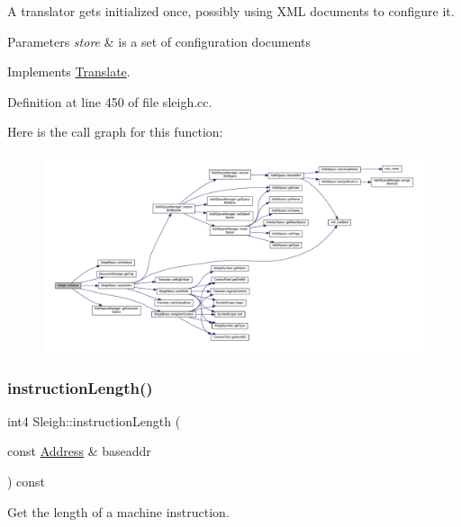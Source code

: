 A translator gets initialized once, possibly using X\+ML documents to configure it. 
\begin{DoxyParams}{Parameters}
{\em store} & is a set of configuration documents \\
\hline
\end{DoxyParams}


Implements \mbox{\hyperlink{class_translate_af8e71e9a9477e9a91be400ecca565df5}{Translate}}.



Definition at line 450 of file sleigh.\+cc.

Here is the call graph for this function\+:
\nopagebreak
\begin{figure}[H]
\begin{center}
\leavevmode
\includegraphics[width=350pt]{class_sleigh_aca7ce17e881917e515aa45ea48810e45_cgraph}
\end{center}
\end{figure}
\mbox{\label{class_sleigh_aec2a92a6246fd8d2704d1f853f01ee85}} 
\subsubsection{\texorpdfstring{instructionLength()}{instructionLength()}}
{\footnotesize\ttfamily int4 Sleigh\+::instruction\+Length (\begin{DoxyParamCaption}\item[{const \mbox{\hyperlink{class_address}{Address}} \&}]{baseaddr }\end{DoxyParamCaption}) const\hspace{0.3cm}{\ttfamily [virtual]}}



Get the length of a machine instruction. 

